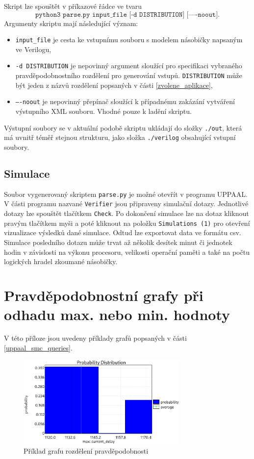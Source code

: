 Skript lze spouštět v příkazové řádce ve tvaru
\begin{equation*}
    \texttt{python3 parse.py input\_file [-d DISTRIBUTION] [----noout]}.
\end{equation*}
Argumenty skriptu mají následující význam:
\begin{itemize}
    \item \texttt{input\_file} je cesta ke vstupnímu souboru s modelem násobičky napsaným ve Verilogu,
    \item \texttt{-d DISTRIBUTION} je nepovinný argument sloužící pro specifikaci vybraného pravděpodobnostního rozdělení pro generování vstupů. \texttt{DISTRIBUTION} může být jeden z názvů rozdělení popsaných v části \ref{zvolene_aplikace},
    \item \texttt{----noout} je nepovinný přepínač sloužící k případnému zakázání vytváření výstupního XML souboru. Vhodné pouze k ladění skriptu.
\end{itemize}
Výstupní soubory se v aktuální podobě skriptu ukládají do složky \texttt{./out}, která má uvnitř téměř stejnou strukturu, jako složka \texttt{./verilog} obsahující vstupní soubory.

\section*{Simulace}
Soubor vygenerovaný skriptem \texttt{parse.py} je možné otevřít v programu UPPAAL. V části programu nazvané \texttt{Verifier} jsou připraveny simulační dotazy. Jednotlivé dotazy lze spouštět tlačítkem \texttt{Check}. Po dokončení simulace lze na dotaz kliknout pravým tlačítkem myši a poté kliknout na položku \texttt{Simulations (1)} pro otevření vizualizace výsledků dané simulace. Odtud lze exportovat data ve formátu csv. Simulace posledního dotazu může trvat až několik desítek minut či jednotek hodin v závislosti na výkonu procesoru, velikosti operační paměti a také na počtu logických hradel zkoumané násobičky.

\chapter{Pravděpodobnostní grafy při odhadu max. nebo min. hodnoty} \label{append:prob_plots}
V této příloze jsou uvedeny příklady grafů popsaných v části \ref{uppaal_smc_queries}.

\begin{figure}[H]
    \centering
    \includegraphics[width=0.75\textwidth]{obrazky-figures/plot_prob_dist.png}
    \caption{Příklad grafu rozdělení pravděpodobnosti}
    \label{fig:plot_prob_dist}
\end{figure}

